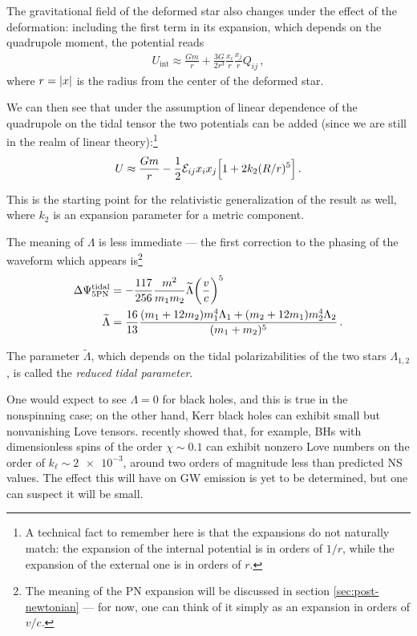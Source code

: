 \documentclass[main.tex]{subfiles}
\begin{document}
The gravitational field of the deformed star also changes under the effect of the deformation: including the first term in its expansion, which depends on the quadrupole moment, the potential reads  
%
\begin{align}
U _{\text{int}} \approx \frac{Gm}{r} + \frac{3G}{2r^3} \frac{x_i}{r} \frac{x_j}{r} Q_{ij}
\,,
\end{align}
%
where \(r = \abs{x}\) is the radius from the center of the deformed star.

We can then see that under the assumption of linear dependence of the quadrupole on the tidal tensor the two potentials can be added (since we are still in the realm of linear theory):\footnote{A technical fact to remember here is that the expansions do not naturally match: the expansion of the internal potential is in orders of \(1/r\), while the expansion of the external one is in orders of \(r\). } 
%
\begin{align}
U \approx \frac{Gm}{r} - \frac{1}{2} \mathcal{E}_{ij} x_i x_j \qty[1 + 2 k_2 (R / r)^{5}]
\,.
\end{align}

This is the starting point for the relativistic generalization of the result as well, where \(k_2 \) is an expansion parameter for a metric component. 

The meaning of \(\Lambda \) is less immediate ---  the first correction to the phasing of the waveform which appears is\footnote{The meaning of the \ac{PN} expansion will be discussed in section \ref{sec:post-newtonian} --- for now, one can think of it simply as an expansion in orders of \(v/c\).} \cites[eq.\ 14.231]{maggioreGravitationalWavesVolume2018}{flanaganConstrainingNeutronStar2008}
%
\begin{subequations}
\begin{align}
\Delta \Psi^{\text{tidal}}_{\text{5PN}} &= - \frac{117}{256} \frac{m^2}{m_1 m_2 } \widetilde{\Lambda } \qty(\frac{v}{c})^{5} 
\\
\widetilde{\Lambda} &= \frac{16}{13} \frac{(m_1 + 12m_2 ) m_1^{4} \Lambda_1 + (m_2 + 12 m_1 ) m_2^{4} \Lambda_2 }{(m_1 +m_2 )^{5}}
\,.
\end{align}
\end{subequations}

The parameter \(\widetilde{\Lambda}\), which depends on the tidal polarizabilities of the two stars \(\Lambda_{1, 2}\), is called the \emph{reduced tidal parameter}. 

One would expect to see \(\Lambda = 0\) for black holes, and this is true in the nonspinning case; on the other hand, Kerr black holes can exhibit small but nonvanishing Love tensors. \textcite{letiecSpinningBlackHoles2021} recently showed that, for example, \acsp{BH} with dimensionless spins of the order \(\chi \sim 0.1\) can exhibit nonzero Love numbers on the order of \(k_\ell \sim \num{2e-3}\), around two orders of magnitude less than predicted \ac{NS} values. 
The effect this will have on \ac{GW} emission is yet to be determined, but one can suspect it will be small.
\end{document}
